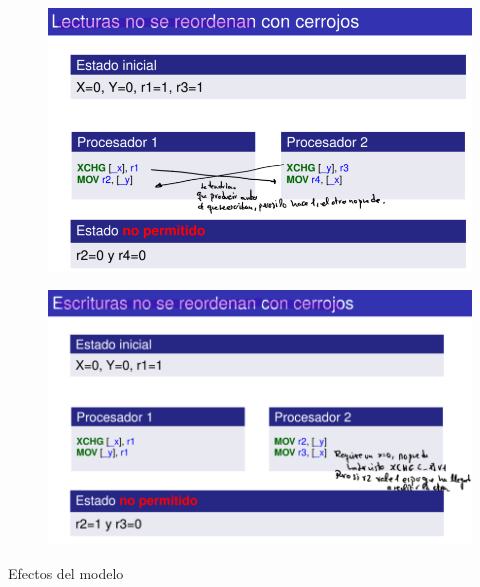 \documentclass[12pt, twoside, openright]{report} %
\begin{document}
    \begin{figure}[H]
      {\includegraphics[scale=.5]{Untitled 70.png}}
    \end{figure}
    \begin{figure}[H]
      {\includegraphics[scale=.45]{Untitled 71.png}}
    \end{figure}
    \pagebreak
    Efectos del modelo
\end{document}
